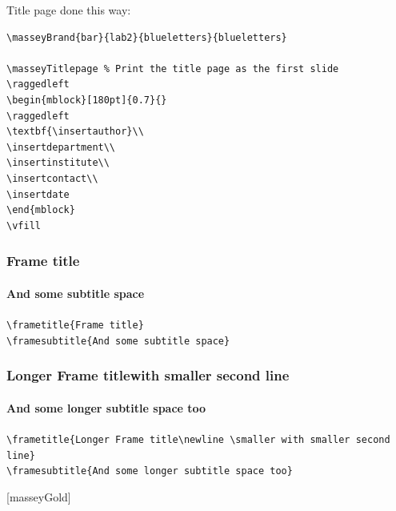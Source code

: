 \documentclass[10pt,aspectratio=43]{beamer}
\begin{document}
\begin{frame}[fragile]
Title page done this way:
\begin{verbatim}
\masseyBrand{bar}{lab2}{blueletters}{blueletters}

\masseyTitlepage % Print the title page as the first slide
\raggedleft
\begin{mblock}[180pt]{0.7}{}
\raggedleft
\textbf{\insertauthor}\\
\insertdepartment\\
\insertinstitute\\
\insertcontact\\
\insertdate
\end{mblock}
\vfill

\end{verbatim}

\end{frame}


\masseyBrand{}{}{}{}


\begin{frame}
\frametitle{Frame title}
\framesubtitle{And some subtitle space}

\verb|\frametitle{Frame title}|\\
\verb|\framesubtitle{And some subtitle space}|
\end{frame}

\begin{frame}
\frametitle{Longer Frame title\newline \smaller with smaller second line}
\framesubtitle{And some longer subtitle space too}

\verb|\frametitle{Longer Frame title\newline \smaller with smaller second line}|\\
\verb|\framesubtitle{And some longer subtitle space too}|
\end{frame}


[masseyGold]
\end{document}

